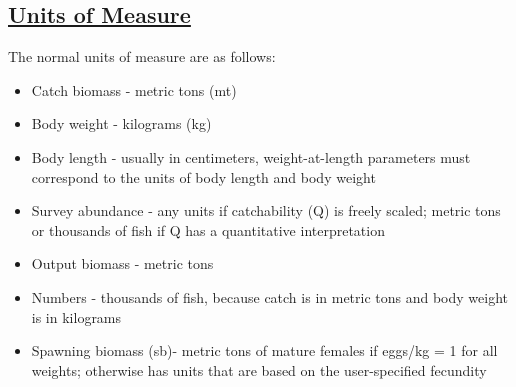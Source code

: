 \subsection[Units Of Measure]{\protect\hyperlink{UnitsOfMeasure}{Units of Measure}}
The normal units of measure are as follows:
\begin{itemize}
	\item Catch biomass - metric tons (mt)
	\item Body weight - kilograms (kg)
	\item Body length - usually in centimeters, weight-at-length parameters must correspond to the units of body length and body weight	
	\item Survey abundance - any units if catchability (Q) is freely scaled; metric tons or thousands of fish if Q has a quantitative interpretation	
	\item Output biomass - metric tons
	\item Numbers - thousands of fish, because catch is in metric tons and body weight is in kilograms	
	\item Spawning biomass (\gls{sb})- metric tons of mature females if eggs/kg = 1 for all weights; otherwise has units that are based on the user-specified fecundity	
\end{itemize}

\hypertarget{RecrTiming}{}

